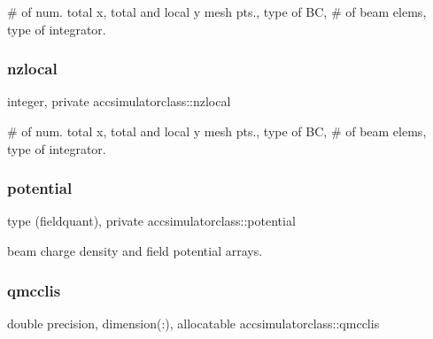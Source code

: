 \# of num. total x, total and local y mesh pts., type of BC, \# of beam elems, type of integrator. 

\mbox{\label{namespaceaccsimulatorclass_af547860c8c8685ee94f4cca4da117acc}} 
\subsubsection{\texorpdfstring{nzlocal}{nzlocal}}
{\footnotesize\ttfamily integer, private accsimulatorclass\+::nzlocal\hspace{0.3cm}{\ttfamily [private]}}



\# of num. total x, total and local y mesh pts., type of BC, \# of beam elems, type of integrator. 

\mbox{\label{namespaceaccsimulatorclass_a2d7cf949e4c05edf370cfbb6ee936951}} 
\subsubsection{\texorpdfstring{potential}{potential}}
{\footnotesize\ttfamily type (fieldquant), private accsimulatorclass\+::potential\hspace{0.3cm}{\ttfamily [private]}}



beam charge density and field potential arrays. 

\mbox{\label{namespaceaccsimulatorclass_a6dce29a29cf7312e80b95b700300e37d}} 
\subsubsection{\texorpdfstring{qmcclis}{qmcclis}}
{\footnotesize\ttfamily double precision, dimension(\+:), allocatable accsimulatorclass\+::qmcclis}

\mbox{\label{namespaceaccsimulatorclass_a41077f15e4eaaf833944e89b231a9df9}} 
